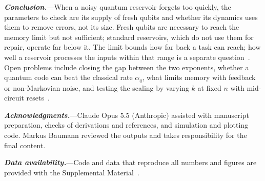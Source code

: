 \documentclass[aps,prl,twocolumn,superscriptaddress,floatfix]{revtex4-2}
\theoremstyle{plain}
\newcommand{\runin}[1]{\textit{\textbf{#1}}---}
\begin{document}
\runin{Conclusion.}When a noisy quantum reservoir forgets too quickly, the parameters to check are its supply of fresh qubits and whether its dynamics uses them to remove errors, not its size. Fresh qubits are necessary to reach the memory limit but not sufficient; standard reservoirs, which do not use them for repair, operate far below it. The limit bounds how far back a task can reach; how well a reservoir processes the inputs within that range is a separate question~\cite{Cao2026}. Open problems include closing the gap between the two exponents, whether a quantum code can beat the classical rate $\alpha_q$, what limits memory with feedback or non-Markovian noise, and testing the scaling by varying $k$ at fixed $n$ with mid-circuit resets~\cite{Yasuda2023,Hu2024}.

\begin{acknowledgments}
\runin{Acknowledgments.}Claude Opus 5.5 (Anthropic) assisted with manuscript preparation, checks of derivations and references, and simulation and plotting code. Markus Baumann reviewed the outputs and takes responsibility for the final content.
\end{acknowledgments}

\runin{Data availability.}Code and data that reproduce all numbers and figures are provided with the Supplemental Material~\cite{SM}.

\nocite{Xiong2025,Dao2026}

\end{document}
